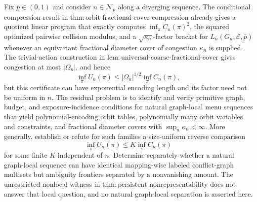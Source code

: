 Fix \(\bar p\in(0,1)\) and consider \(n\in\mathcal N_{\bar p}\) along a diverging sequence. The conditional compression result in \(\mathrm{thm{:}orbit\text{-}fractional\text{-}cover\text{-}compression}\) already gives a quotient linear program that exactly computes \(\inf_\pi C_n(\pi)^2\), the squared optimized pairwise collision modulus, and a \(\sqrt{\kappa_n}\)-factor bracket for \(L_n(G_n,\mathcal E,\bar p)\) whenever an equivariant fractional diameter cover of congestion \(\kappa_n\) is supplied. The trivial-action construction in \(\mathrm{lem{:}universal\text{-}coarse\text{-}fractional\text{-}cover}\) gives congestion at most \(|\Omega_n|\), and hence
\[
 \inf_\pi U_n(\pi)
 \le |\Omega_n|^{1/2}\inf_\pi C_n(\pi),
\]
but this certificate can have exponential encoding length and its factor need not be uniform in \(n\). The residual problem is to identify and verify primitive graph, budget, and exposure-incidence conditions for natural graph-local menu sequences that yield polynomial-encoding orbit tables, polynomially many orbit variables and constraints, and fractional diameter covers with \(\sup_n\kappa_n<\infty\). More generally, establish or refute for such families a size-uniform reverse comparison
\[
 \inf_\pi U_n(\pi)\le K\inf_\pi C_n(\pi)
\]
for some finite \(K\) independent of \(n\). Determine separately whether a natural graph-local sequence can have identical mapping-wise labeled conflict-graph multisets but ambiguity frontiers separated by a nonvanishing amount. The unrestricted nonlocal witness in \(\mathrm{thm{:}persistent\text{-}nonrepresentability}\) does not answer that local question, and no natural graph-local separation is asserted here.